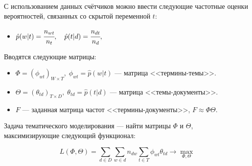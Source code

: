 С использованием данных счётчиков можно ввести следующие частотные оценки вероятностей, связанных со скрытой переменной $t$:

\begin{itemize}\label{label_1}
\item $ 
	\hat p(w|t) = \cfrac{n_{wt}}{n_t}, \quad
	\hat p(t|d) = \cfrac{n_{dt}}{n_d}, $ 
\end{itemize}

Вводятся следующие матрицы:
\begin{itemize}
\item $\Phi = (\phi_{wt})_{W \times T}, \; \phi_{wt} = \hat p(w|t)$ --- матрица <<термины-темы>>.
\item $\Theta = (\theta_{td})_{T \times D}, \; \theta_{td} = \hat p(t|d)$ --- матрица <<темы-документы>>. 
\item $F$ --- заданная матрица частот <<термины-документы>>, $F \approx \Phi \Theta$.
\end{itemize}

Задача тематического моделирования --- найти матрицы $\Phi$ и $\Theta$, максимизирующие следующий функционал:

\begin{equation}\label{eq_1}
 	L(\Phi, \Theta) = \sum_{d \in D} \sum_{w \in d} n_{dw} \sum_{t \in T} \phi_{wt} \theta_{td} \rightarrow \max_{\Phi, \Theta}
\end{equation}
